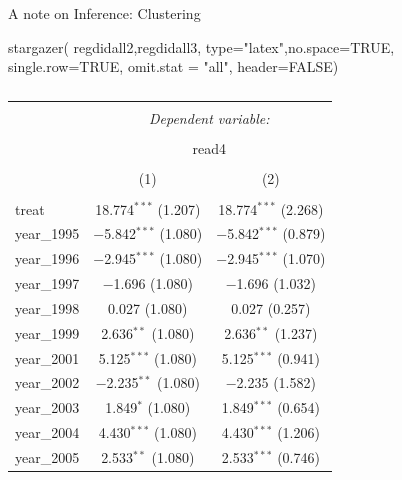 \documentclass[
  ignorenonframetext,
]{beamer}
\newenvironment{Shaded}{\begin{snugshade}}{\end{snugshade}}
\newcommand{\AttributeTok}[1]{\textcolor[rgb]{0.77,0.63,0.00}{#1}}
\newcommand{\ConstantTok}[1]{\textcolor[rgb]{0.00,0.00,0.00}{#1}}
\newcommand{\FunctionTok}[1]{\textcolor[rgb]{0.00,0.00,0.00}{#1}}
\newcommand{\NormalTok}[1]{#1}
\newcommand{\StringTok}[1]{\textcolor[rgb]{0.31,0.60,0.02}{#1}}
\begin{document}
\begin{frame}[fragile]{A note on Inference: Clustering}
\protect\hypertarget{a-note-on-inference-clustering-2}{}
\tiny

\begin{Shaded}
\begin{Highlighting}[]
\FunctionTok{stargazer}\NormalTok{( regdidall2,regdidall3, }\AttributeTok{type=}\StringTok{"latex"}\NormalTok{,}\AttributeTok{no.space=}\ConstantTok{TRUE}\NormalTok{, }\AttributeTok{single.row=}\ConstantTok{TRUE}\NormalTok{, }\AttributeTok{omit.stat =} \StringTok{"all"}\NormalTok{, }\AttributeTok{header=}\ConstantTok{FALSE}\NormalTok{)}
\end{Highlighting}
\end{Shaded}

\begin{table}[!htbp] \centering 
  \caption{} 
  \label{} 
\begin{tabular}{@{\extracolsep{5pt}}lcc} 
\\[-1.8ex]\hline 
\hline \\[-1.8ex] 
 & \multicolumn{2}{c}{\textit{Dependent variable:}} \\ 
\cline{2-3} 
\\[-1.8ex] & \multicolumn{2}{c}{read4} \\ 
\\[-1.8ex] & (1) & (2)\\ 
\hline \\[-1.8ex] 
 treat & 18.774$^{***}$ (1.207) & 18.774$^{***}$ (2.268) \\ 
  year\_1995 & $-$5.842$^{***}$ (1.080) & $-$5.842$^{***}$ (0.879) \\ 
  year\_1996 & $-$2.945$^{***}$ (1.080) & $-$2.945$^{***}$ (1.070) \\ 
  year\_1997 & $-$1.696 (1.080) & $-$1.696 (1.032) \\ 
  year\_1998 & 0.027 (1.080) & 0.027 (0.257) \\ 
  year\_1999 & 2.636$^{**}$ (1.080) & 2.636$^{**}$ (1.237) \\ 
  year\_2001 & 5.125$^{***}$ (1.080) & 5.125$^{***}$ (0.941) \\ 
  year\_2002 & $-$2.235$^{**}$ (1.080) & $-$2.235 (1.582) \\ 
  year\_2003 & 1.849$^{*}$ (1.080) & 1.849$^{***}$ (0.654) \\ 
  year\_2004 & 4.430$^{***}$ (1.080) & 4.430$^{***}$ (1.206) \\ 
  year\_2005 & 2.533$^{**}$ (1.080) & 2.533$^{***}$ (0.746) \\ 

\end{tabular}
\end{table}
\end{frame}
\end{document}

